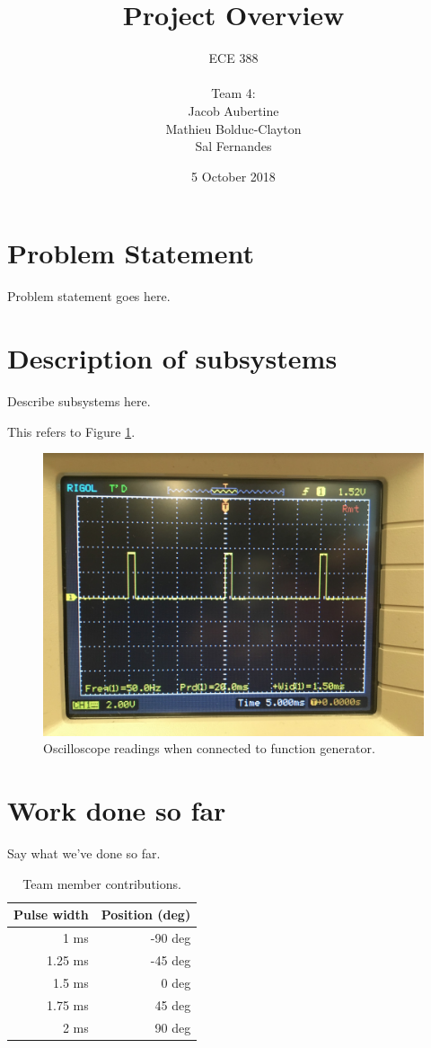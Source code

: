\documentclass{article}
\title{Project Overview}
\date{5 October 2018}
\author{
	ECE 388
	\\
	\\
	Team 4:
	\\
	Jacob Aubertine
	\\
	Mathieu Bolduc-Clayton
	\\
	Sal Fernandes
}
\begin{document}
	\maketitle
	\newpage
	\tableofcontents
	\newpage

	\section{Problem Statement}
	Problem statement goes here.

	\section{Description of subsystems}
	Describe subsystems here.
	
	This refers to Figure \ref{fig:oscilloscope}.

	\begin{figure}[h!]
		\includegraphics[width=\linewidth]{oscilloscope.png}
		\caption{Oscilloscope readings when connected to function generator.}
		\label{fig:oscilloscope}
	\end{figure}
	
	\section{Work done so far}
	Say what we've done so far.
	
	\begin{table}[h!]
  		\begin{center}
    			\caption{Team member contributions.}
    			\label{tab:table1}
    			\begin{tabular}{r|r}
      				\textbf{Pulse width} & \textbf{Position (deg)} \\
				\hline
      				1 ms& -90 deg\\
      				1.25 ms & -45 deg\\
      				1.5 ms & 0 deg\\
      				1.75 ms & 45 deg\\
				2 ms& 90 deg\\
   			 \end{tabular}
  		\end{center}
	\end{table}
	
\end{document}
